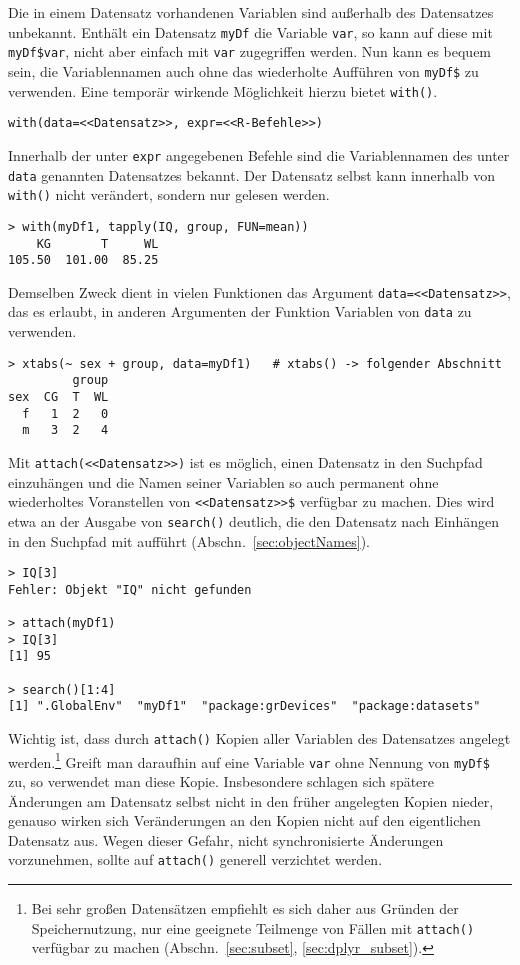 Die in einem Datensatz vorhandenen Variablen sind außerhalb des Datensatzes unbekannt. Enthält ein Datensatz \lstinline!myDf! die Variable \lstinline!var!, so kann auf diese mit \lstinline!myDf$var!, nicht aber einfach mit \lstinline!var! zugegriffen werden. Nun kann es bequem sein, die Variablennamen auch ohne das wiederholte Aufführen von \lstinline!myDf$! zu verwenden. Eine temporär wirkende Möglichkeit hierzu bietet \lstinline!with()!.
\begin{lstlisting}
with(data=<<Datensatz>>, expr=<<R-Befehle>>)
\end{lstlisting}

Innerhalb der unter \lstinline!expr! angegebenen Befehle sind die Variablennamen des unter \lstinline!data! genannten Datensatzes bekannt. Der Datensatz selbst kann innerhalb von \lstinline!with()! nicht verändert, sondern nur gelesen werden.
\begin{lstlisting}
> with(myDf1, tapply(IQ, group, FUN=mean))
    KG       T     WL
105.50  101.00  85.25
\end{lstlisting}

Demselben Zweck dient in vielen Funktionen das Argument
\lstinline!data=<<Datensatz>>!, das es erlaubt, in anderen Argumenten der Funktion Variablen von \lstinline!data! zu verwenden.
\begin{lstlisting}
> xtabs(~ sex + group, data=myDf1)   # xtabs() -> folgender Abschnitt
         group
sex  CG  T  WL
  f   1  2   0
  m   3  2   4
\end{lstlisting}

Mit \lstinline!attach(<<Datensatz>>)! ist es möglich, einen Datensatz in den Suchpfad einzuhängen und die Namen seiner Variablen so auch permanent ohne wiederholtes Voranstellen von \lstinline!<<Datensatz>>$! verfügbar zu machen. Dies wird etwa an der Ausgabe von \lstinline!search()! deutlich, die den Datensatz nach Einhängen in den Suchpfad mit aufführt (Abschn.\ \ref{sec:objectNames}).
\begin{lstlisting}
> IQ[3]
Fehler: Objekt "IQ" nicht gefunden

> attach(myDf1)
> IQ[3]
[1] 95

> search()[1:4]
[1] ".GlobalEnv"  "myDf1"  "package:grDevices"  "package:datasets"
\end{lstlisting}

Wichtig ist, dass durch \lstinline!attach()! Kopien aller Variablen des Datensatzes angelegt werden.\footnote{Bei sehr großen Datensätzen empfiehlt es sich daher aus Gründen der Speichernutzung, nur eine geeignete Teilmenge von Fällen mit \lstinline!attach()! verfügbar zu machen (Abschn.\ \ref{sec:subset}, \ref{sec:dplyr_subset}).} Greift man daraufhin auf eine Variable \lstinline!var! ohne Nennung von \lstinline!myDf$! zu, so verwendet man diese Kopie. Insbesondere schlagen sich spätere Änderungen am Datensatz selbst nicht in den früher angelegten Kopien nieder, genauso wirken sich Veränderungen an den Kopien nicht auf den eigentlichen Datensatz aus. Wegen dieser Gefahr, nicht synchronisierte Änderungen vorzunehmen, sollte auf \lstinline!attach()! generell verzichtet werden.


